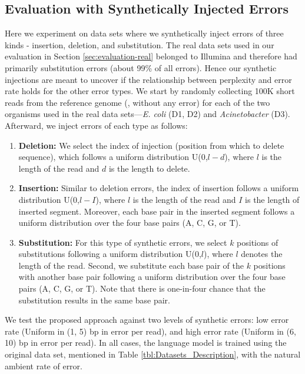 
\subsection{Evaluation with Synthetically Injected Errors}
Here we experiment on data sets where we synthetically inject errors of three kinds - insertion, deletion, and substitution. The real data sets used in our evaluation in Section \ref{sec:evaluation-real} belonged to Illumina and therefore had primarily substitution errors (about 99\% of all errors). Hence our synthetic injections are meant to uncover if the relationship between perplexity and error rate holds for the other error types. 
We start by randomly collecting 100K short reads from the reference genome (\ie, without any error) for each of the two organisms used in the real data sets---\textit{E. coli} (D1, D2) and \textit{Acinetobacter} (D3). Afterward, we inject errors of each type as follows:
\begin{enumerate}[leftmargin=*]
\item \textbf{Deletion:} We select the index of injection (position from which to delete sequence), which follows a uniform distribution U(0,$l-d$), where $l$ is the length of the read and $d$ is the length to delete.
\item \textbf{Insertion:} Similar to deletion errors, the index of insertion follows a uniform distribution U(0,$l-I$), where $l$ is the length of the read and $I$ is the length of inserted segment. Moreover, each base pair in the inserted segment follows a uniform distribution over the four base pairs (A, C, G, or T).
\item \textbf{Substitution:} For this type of synthetic errors, we select $k$ positions of substitutions following a uniform distribution U(0,$l$), where $l$ denotes the length of the read. Second, we substitute each base pair of the $k$ positions with another base pair following a uniform distribution over the four base pairs (A, C, G, or T). Note that there is one-in-four chance that the substitution results in the same base pair. 
\end{enumerate}
We test the proposed approach against two levels of synthetic errors: low error rate (Uniform in (1, 5) bp in error per read), and high error rate (Uniform in (6, 10) bp in error per read). In all cases, the language model is trained using the original data set, mentioned in Table \ref{tbl:Datasets_Description}, with the natural ambient rate of error. 
